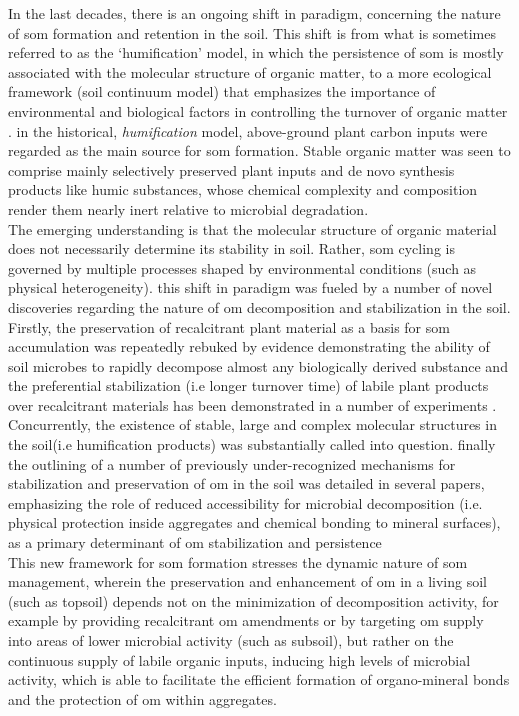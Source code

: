 \documentclass[12pt]{report}
\begin{document}
		In the last  decades, there is an ongoing shift in  paradigm, concerning the nature of \gls{som} formation and retention in the soil. This shift is from what is sometimes referred to as the ‘humification’ model, in which the persistence of \gls{som} is mostly associated with the molecular structure of organic matter, to a more ecological framework (soil continuum model) that emphasizes the importance of environmental and biological factors in controlling the turnover of organic matter \citep{lehmann2015}. in the historical, \textit{humification} model, above-ground plant carbon inputs were regarded as the main source for \gls{som} formation. Stable organic matter was seen to comprise mainly selectively preserved plant inputs and de novo synthesis products like humic substances, whose chemical complexity and composition render them nearly inert relative to microbial degradation.\\
		The emerging understanding is that the molecular structure of organic material does not necessarily determine its stability in soil. Rather, \gls{som} cycling is governed by multiple processes shaped by environmental conditions (such as physical heterogeneity)\citep{schmidt2011c}. this shift in paradigm was fueled by a number of novel discoveries regarding the nature of \gls{om} decomposition and stabilization in the soil. Firstly, the preservation of recalcitrant plant material as a basis for \gls{som} accumulation was repeatedly rebuked by evidence demonstrating the ability of soil microbes to rapidly decompose almost any biologically derived substance \citep{dungait2012, marschner2008} and the preferential stabilization (i.e longer turnover time) of labile plant products over recalcitrant materials has been demonstrated in a number of experiments \citep{cotrufo2013, kleber2011}. Concurrently, the existence of stable, large and complex molecular structures in the soil(i.e humification products) was substantially called into question\citep{kleber2010}. finally the outlining of a number of previously under-recognized mechanisms for stabilization and preservation of \gls{om} in the soil was detailed in several papers, emphasizing the role of reduced accessibility for microbial decomposition (i.e. physical protection inside aggregates and chemical bonding to mineral surfaces), as a primary determinant of \gls{om} stabilization and persistence\citep{lutzow2006, lutzow2008, ekschmitt2008}\.\\
		This new framework for \gls{som} formation stresses the dynamic nature of \gls{som} management, wherein the preservation and enhancement of \gls{om} in a living soil (such as topsoil) depends not on the minimization of decomposition activity, for example by providing recalcitrant \gls{om} amendments or by targeting \gls{om} supply into areas of lower microbial activity (such as subsoil), but rather on the continuous supply of labile organic inputs, inducing high levels of microbial activity, which is able to facilitate the efficient formation of organo-mineral bonds and the protection of \gls{om} within aggregates\citep{dungait2012,barre2016,basler2015}.
		
\end{document}
